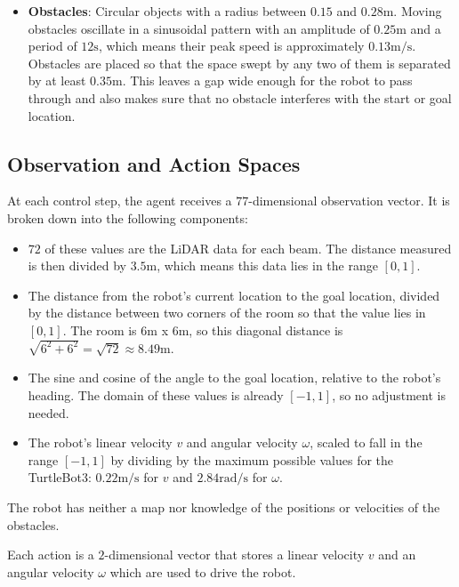\documentclass[conference, 11pt]{IEEEtran}
\begin{document}
\begin{itemize}
        \item \textbf{Obstacles}: Circular objects with a radius between $0.15$ and $0.28 \mathrm{m}$. Moving obstacles oscillate in a sinusoidal pattern with an amplitude of $0.25 \mathrm{m}$ and a period of $12 \mathrm{s}$, which means their peak speed is approximately $0.13 \mathrm{m/s}$. Obstacles are placed so that the space swept by any two of them is separated by at least $0.35 \mathrm{m}$. This leaves a gap wide enough for the robot to pass through and also makes sure that no obstacle interferes with the start or goal location.
    \end{itemize}

\subsection{Observation and Action Spaces}
At each control step, the agent receives a $77$-dimensional observation vector. It is broken down into the following components:
    \begin{itemize}
        \item $72$ of these values are the LiDAR data for each beam. The distance measured is then divided by $3.5 \mathrm{m}$, which means this data lies in the range $[0, 1]$.

        \item The distance from the robot's current location to the goal location, divided by the distance between two corners of the room so that the value lies in $[0, 1]$. The room is $6 \mathrm{m}$ x $6 \mathrm{m}$, so this diagonal distance is $\sqrt{6^2 + 6^2} = \sqrt{72} \approx 8.49 \mathrm{m}$.

        \item The sine and cosine of the angle to the goal location, relative to the robot's heading. The domain of these values is already $[-1, 1]$, so no adjustment is needed.

        \item The robot's linear velocity $v$ and angular velocity $\omega$, scaled to fall in the range $[-1, 1]$ by dividing by the maximum possible values for the TurtleBot3: $0.22 \mathrm{m/s}$ for $v$ and $2.84 \mathrm{rad/s}$ for $\omega$.
    \end{itemize}

The robot has neither a map nor knowledge of the positions or velocities of the obstacles.

Each action is a $2$-dimensional vector that stores a linear velocity $v$ and an angular velocity $\omega$ which are used to drive the robot.
\end{document}
